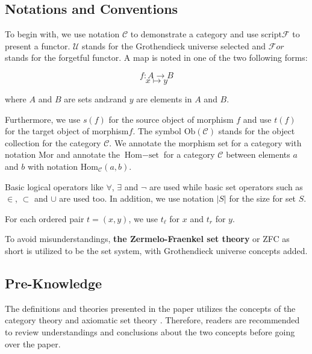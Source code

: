\documentclass[preprint]{elsarticle}
\numberwithin{theorem}{section}	%
\numberwithin{axiom}{section}	%
\numberwithin{definition}{section}	%
\begin{document}
\subsection{Notations and Conventions}

To begin with, we use notation \(\mathcal{C}\) to demonstrate a category and use script\(\mathcal{F}\) to present a functor. \(\mathcal{U}\) stands for the Grothendieck universe selected and \(\mathcal{F}\mathit{o}\mathit{r}\) stands for the forgetful functor. A map is noted in one of the two following forms:

\begin{equation*}
	f: A \to B
\end{equation*}
\begin{equation*}
	x\mapsto y
\end{equation*}

\noindent where \(A\) and \(B\) are sets and\(x\)and \(y\) are elements in \(A\) and \(B\).

 Furthermore, we use \(s(f)\) for the source object of morphism \(f\)\textit{  }and use \(t(f)\) for the target object of morphism\(f\). The symbol \(\text{Ob}(\mathcal{C})\) stands for the object collection for the category \(\mathcal{C}\). We annotate the morphism set for a category with notation \(\text{Mor}\) and annotate the \(\text{Hom}-\text{set}\) for a category \(\mathcal{C}\) between elements \(a\) and \(b\) with notation \(\text{Hom}_{\mathcal{C}}(a,b)\).

Basic logical operators like \(\forall\), \(\exists\) and \(\neg\) are used while basic set operators such as \(\in\), \(\subset\) and \(\cup\) are used too. In addition, we use notation \(|S|\) for the size for set \(S\).

For each ordered pair \(t=(x,y)\), we use \(t_{\ell }\) for \(x\) and \(t_{\mathit{r}}\) for \(y\).

To avoid misunderstandings, \textbf{the Zermelo-Fraenkel set theory} or ZFC as short is utilized to be the set system, with Grothendieck universe concepts added. \cite{Li2019}

\subsection{Pre-Knowledge}

The definitions and theories presented in the paper utilizes the concepts of the category theory \cite{Li2019} and axiomatic set theory \cite{Li2019}. Therefore, readers are recommended to review understandings and conclusions about the two concepts before going over the paper.
\end{document}
